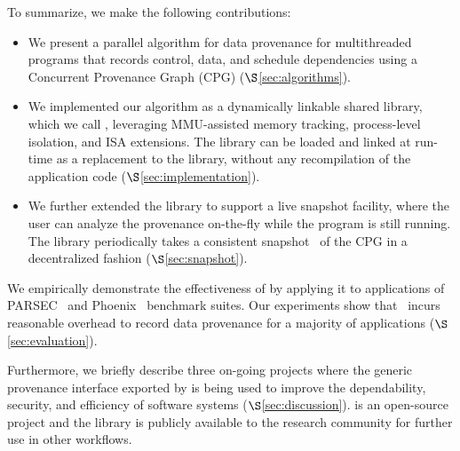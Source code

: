 To summarize, we make the following contributions:
\begin{itemize}

\item We present a parallel algorithm for data provenance for multithreaded programs that records control, data, and schedule dependencies using a Concurrent Provenance Graph (CPG) ($\S$\ref{sec:algorithms}).

\item We implemented our algorithm as a dynamically linkable shared library, which we call \projecttitle, leveraging MMU-assisted memory tracking, process-level isolation, and \intelpt ISA extensions.  The \projecttitle library can be loaded and linked at run-time as a replacement to the \pthreads library, without any recompilation  of the application code ($\S$\ref{sec:implementation}).

\item We further extended the library to support a live snapshot facility, where the user can analyze the provenance on-the-fly while the program is still running. The library periodically takes a consistent snapshot~\cite{chandy-lamport} of the CPG in a decentralized fashion ($\S$\ref{sec:snapshot}).



\end{itemize}



We  empirically demonstrate  the effectiveness of \projecttitle by applying it to applications of  PARSEC~\cite{parsec} and Phoenix~\cite{phoenix} benchmark suites. Our experiments show that \projecttitle~incurs reasonable overhead to record data provenance for a majority of applications ($\S$\ref{sec:evaluation}). 

Furthermore, we briefly describe three on-going projects where the generic provenance interface exported by \projecttitle is being used to improve the dependability, security, and efficiency of software systems  ($\S$\ref{sec:discussion}). \projecttitle is an open-source project and the library is publicly available to the research community for further use in other workflows.  

